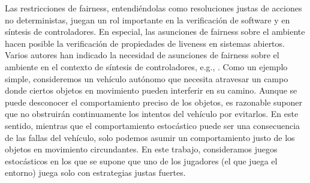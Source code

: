 	Las restricciones de fairness, entendiéndolas como resoluciones justas de acciones no deterministas, juegan un rol importante en la verificación de software y en síntesis de controladores.
	En especial, las asunciones de fairness sobre el ambiente hacen posible la verificación de propiedades de liveness en sistemas abiertos. 
	Varios autores han indicado la necesidad de asunciones de fairness sobre el ambiente en el contexto de síntesis de controladores, e.g., \cite{DBLP:conf/fossacs/AsarinCV10,DBLP:conf/icse/DIppolitoBPU11}.
        Como un ejemplo simple, consideremos un vehículo autónomo que necesita atravesar un campo donde ciertos objetos en movimiento pueden interferir en su camino. Aunque se puede desconocer el comportamiento preciso de los objetos, es razonable suponer que no obstruirán continuamente los intentos del vehículo por evitarlos. En este sentido, mientras que el comportamiento estocástico puede ser una consecuencia de las fallas del vehículo, solo podemos asumir un comportamiento justo de los objetos en movimiento circundantes.
        En este trabajo, consideramos juegos estocásticos en los que se supone que uno de los jugadores (el que juega el entorno) juega solo con estrategias justas fuertes.

